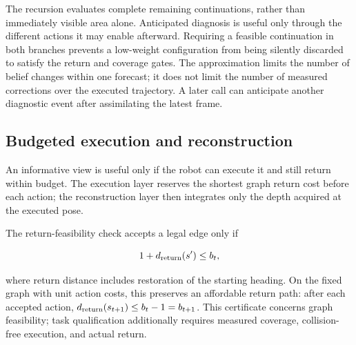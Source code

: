 The recursion evaluates complete remaining continuations, rather than immediately visible area alone. Anticipated diagnosis is useful only through the different actions it may enable afterward. Requiring a feasible continuation in both branches prevents a low-weight configuration from being silently discarded to satisfy the return and coverage gates. The approximation limits the number of belief changes within one forecast; it does not limit the number of measured corrections over the executed trajectory. A later call can anticipate another diagnostic event after assimilating the latest frame.

\hypertarget{budgeted-execution-and-reconstruction}{%
\subsection{Budgeted execution and reconstruction}\label{budgeted-execution-and-reconstruction}}

An informative view is useful only if the robot can execute it and still return within budget. The execution layer reserves the shortest graph return cost before each action; the reconstruction layer then integrates only the depth acquired at the executed pose.

The return-feasibility check accepts a legal edge only if

\[
1+d_{\rm return}(s')\le b_t,
\]

where return distance includes restoration of the starting heading. On the fixed graph with unit action costs, this preserves an affordable return path: after each accepted action, \(d_{\rm return}(s_{t+1})\le b_t-1=b_{t+1}\). This certificate concerns graph feasibility; task qualification additionally requires measured coverage, collision-free execution, and actual return.

